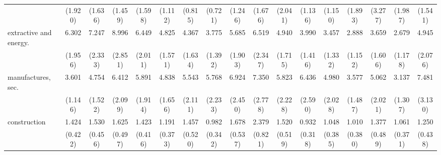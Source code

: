 {\begin{tabular}{l*{16}{c}}
                    &     (1.920)         &     (1.636)         &     (1.459)         &     (1.598)         &     (1.112)         &     (0.815)         &     (0.721)         &     (1.246)         &     (1.676)         &     (2.041)         &     (1.136)         &     (1.150)         &     (1.893)         &     (3.277)         &     (1.987)         &     (1.541)         \\
[1em]
extractive and energy.&       6.302\sym{***}&       7.247\sym{***}&       8.996\sym{***}&       6.449\sym{***}&       4.825\sym{***}&       4.367\sym{***}&       3.775\sym{***}&       5.685\sym{***}&       6.519\sym{***}&       4.940\sym{***}&       3.990\sym{***}&       3.457\sym{**} &       2.888\sym{**} &       3.659\sym{**} &       2.679\sym{*}  &       4.945\sym{***}\\
                    &     (1.956)         &     (2.333)         &     (2.851)         &     (2.011)         &     (1.571)         &     (1.634)         &     (1.392)         &     (1.903)         &     (2.347)         &     (1.715)         &     (1.416)         &     (1.332)         &     (1.152)         &     (1.606)         &     (1.178)         &     (2.076)         \\
[1em]
manufactures, sec.  &       3.601\sym{***}&       4.754\sym{***}&       6.412\sym{***}&       5.891\sym{***}&       4.838\sym{***}&       5.543\sym{***}&       5.768\sym{***}&       6.924\sym{***}&       7.350\sym{***}&       5.823\sym{***}&       6.436\sym{***}&       4.980\sym{***}&       3.577\sym{**} &       5.062\sym{***}&       3.137\sym{**} &       7.481\sym{***}\\
                    &     (1.146)         &     (1.522)         &     (2.099)         &     (1.914)         &     (1.656)         &     (2.111)         &     (2.233)         &     (2.450)         &     (2.778)         &     (2.228)         &     (2.590)         &     (2.028)         &     (1.487)         &     (2.021)         &     (1.307)         &     (3.130)         \\
[1em]
construction        &       1.424         &       1.530         &       1.625         &       1.423         &       1.191         &       1.457         &       0.982         &       1.678         &       2.379\sym{*}  &       1.520         &       0.932         &       1.048         &       1.010         &       1.377         &       1.061         &       1.250         \\
                    &     (0.422)         &     (0.456)         &     (0.497)         &     (0.416)         &     (0.373)         &     (0.520)         &     (0.342)         &     (0.537)         &     (0.821)         &     (0.519)         &     (0.318)         &     (0.385)         &     (0.380)         &     (0.489)         &     (0.371)         &     (0.438)         \\

\end{tabular}}
